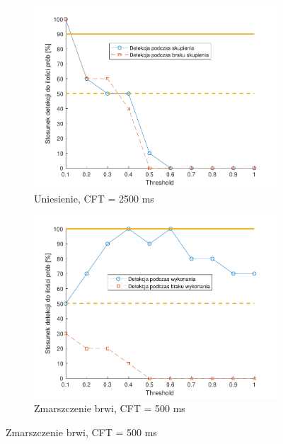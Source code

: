 \documentclass[skorowidz,skroty]{dyplomWEZUT}
\begin{document}
\begin{figure}
    \medskip
    \begin{subfigure}{0.49\textwidth}
    \includegraphics[width=\linewidth]{graphic/up2500}
    \caption{Uniesienie, CFT = 2500 ms\label{fig:up2500}}
    \end{subfigure}\hspace*{\fill}
    \begin{subfigure}{0.49\textwidth}
    \includegraphics[width=\linewidth]{graphic/frown500}
    \caption{Zmarszczenie brwi, CFT = 500 ms\label{fig:frown500}}
    \end{subfigure}
    

\end{figure}
\end{document}
